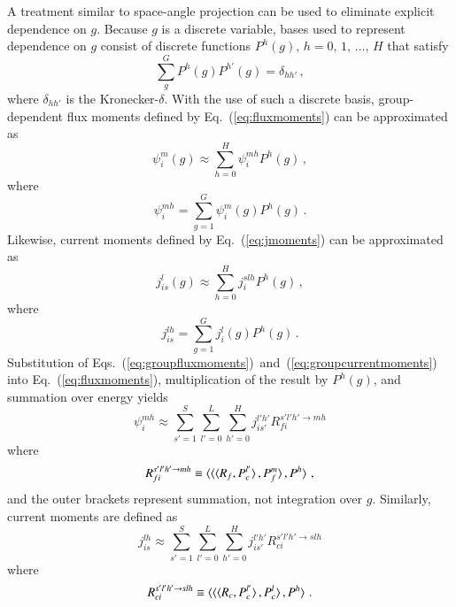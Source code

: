 \documentclass[5p,times,twocolumn,10pt]{elsarticle}
\newcommand{\EQ}[1]{Eq.~(\ref{#1})}               %
\newcommand{\EQSTWO}[2]{Eqs.~(\ref{#1})~and~(\ref{#2})}
\begin{document}
    A treatment similar to space-angle projection can be used to eliminate
    explicit dependence on $g$.  Because $g$ is a discrete variable, bases
    used to represent dependence on $g$ consist of discrete functions
    $P^h(g), \, h = 0,\, 1,\, \ldots, \, H$ that satisfy
    \begin{equation}
        \sum^G_{g} P^h(g) P^{h'}(g) = \delta_{hh'} \, ,
    \end{equation}
    where $\delta_{hh'}$ is the Kronecker-$\delta$.  With the use of such a
    discrete basis, group-dependent flux moments defined by \EQ{eq:fluxmoments}
    can be approximated as
    \begin{equation}
        \psi^{m}_{i}(g) \approx \sum_{h=0}^H  \psi^{mh}_{i} P^h(g) \, ,
        \label{eq:groupfluxmoments}
    \end{equation}
    where
    \begin{equation}
        \psi^{mh}_{i} = \sum^G_{g=1}   \psi^{m}_{i}(g) P^h(g) \, .
    \end{equation}
    Likewise, current moments defined by \EQ{eq:jmoments} can be approximated as
    \begin{equation}
        j^{l}_{is}(g) \approx \sum_{h=0}^H  j^{slh}_{i} P^h(g) \, ,
        \label{eq:groupcurrentmoments}
    \end{equation}
    where
    \begin{equation}
        j^{lh}_{is} = \sum^G_{g=1}   j^{l}_{i}(g) P^h(g) \, .
    \end{equation}
    Substitution of \EQSTWO{eq:groupfluxmoments}{eq:groupcurrentmoments} into
    \EQ{eq:fluxmoments}, multiplication of the result by $P^h(g)$, and
    summation over energy yields
    \begin{equation}
        \psi^{mh}_{i} \approx
        \sum^{S}_{s'=1} \sum_{l'=0}^L \sum^{H}_{h'=0}
        j^{l'h'}_{is'}  R^{s'l'h' \to mh}_{fi}
        \label{eq:finalfluxmoments}
    \end{equation}
    where
    \begin{equation}
        R^{s'l'h' \to mh}_{fi} \equiv
        \braket{ \braket{ \braket{ R_{f}, P^{l'}_c}, P^{m}_f}, P^{h}} \, ,
    \end{equation}
    and the outer brackets represent summation, not integration over $g$.
    Similarly, current moments are defined as
    \begin{equation}
        j^{lh}_{is} \approx
        \sum^{S}_{s'=1}  \sum_{l'=0}^L \sum^{H}_{h'=0}
        j^{l'h'}_{is'}  R^{s'l'h' \to slh}_{ci}
        \label{eq:finalcurrentmoments}
    \end{equation}
    where
    \begin{equation}
        R^{s'l'h' \to slh}_{ci} \equiv
        \braket{ \braket{ \braket{ R_{c}, P^{l'}_c}, P^{l}_c}, P^{h}} \, .
    \end{equation}
\end{document}

